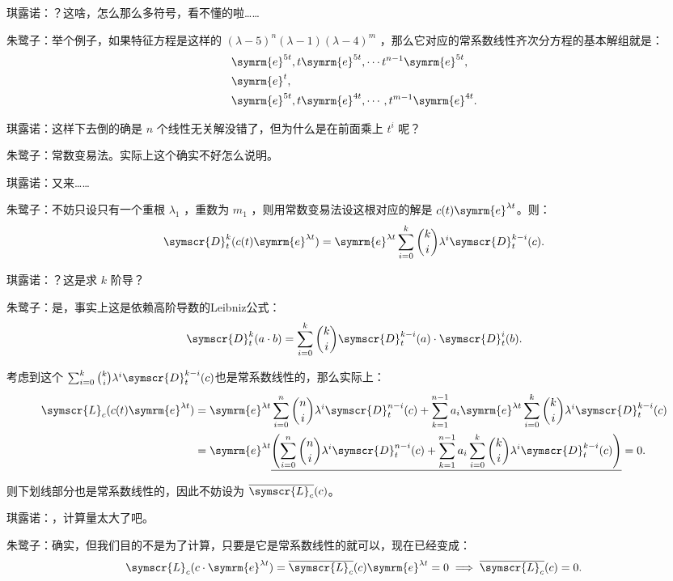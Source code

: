 琪露诺：？这啥，怎么那么多符号，看不懂的啦……

朱鹭子：举个例子，如果特征方程是这样的 \((\lambda -5)^n(\lambda -1)(\lambda -4)^m\) ，那么它对应的常系数线性齐次分方程的基本解组就是：
\[
	\begin{aligned}
		 & \symrm{e} ^{5t},t\symrm{e} ^{5t},\cdots t^{n-1}\symrm{e} ^{5t},  \\
		 & \symrm{e} ^{t},                                                  \\
		 & \symrm{e} ^{5t},t\symrm{e} ^{4t},\cdots ,t^{m-1}\symrm{e} ^{4t}.
	\end{aligned}
\]

琪露诺：这样下去倒的确是 \(n\) 个线性无关解没错了，但为什么是在前面乘上 \(t^i\)  呢？

朱鹭子：常数变易法。实际上这个确实不好怎么说明。

琪露诺：又来……

朱鹭子：不妨只设只有一个重根 \(\lambda_1 \) ，重数为 \(m_1\) ，则用常数变易法设这根对应的解是 \( c(t)\symrm{e} ^{\lambda t}\)。则：
\[
	\symscr{D} _t^k (c(t)\symrm{e} ^{\lambda t})=\symrm{e} ^{\lambda t}\sum_{i=0}^{k} \binom{k}{i}\lambda ^i\symscr{D} ^{k-i}_t(c)
	.\]

琪露诺：？这是求 \(k\) 阶导？

朱鹭子：是，事实上这是依赖高阶导数的Leibniz公式：
\[
	\symscr{D} _t^k(a\cdot b)= \sum_{i=0}^{k} \binom{k}{i}\symscr{D} ^{k-i}_t(a)\cdot \symscr{D} ^{i}_t(b)
	.\]

考虑到这个 \(\sum_{i=0}^{k} \binom{k}{i}\lambda ^i\symscr{D} ^{k-i}_t(c)\)也是常系数线性的，那么实际上：
\[
	\begin{aligned}
		\symscr{L} _c(c(t)\symrm{e} ^{\lambda t}) & = \symrm{e} ^{\lambda t}\sum_{i=0}^{n} \binom{n}{i}\lambda ^i\symscr{D} ^{n-i}_t(c)+\sum_{k=1}^{n-1} a_i\symrm{e} ^{\lambda t}\sum_{i=0}^{k} \binom{k}{i}\lambda ^i\symscr{D} ^{k-i}_t(c)         \\
		                                          & =\symrm{e} ^{\lambda t}\underline{\left( \sum_{i=0}^{n} \binom{n}{i}\lambda ^i\symscr{D} ^{n-i}_t(c)+ \sum_{k=1}^{n-1} a_i\sum_{i=0}^{k} \binom{k}{i}\lambda ^i\symscr{D} ^{k-i}_t(c)\right) }=0.
	\end{aligned}
\]

则下划线部分也是常系数线性的，因此不妨设为 \(\overline{\symscr{L} _c}(c)\)。

琪露诺：，计算量太大了吧。

朱鹭子：确实，但我们目的不是为了计算，只要是它是常系数线性的就可以，现在已经变成：
\[
	\symscr{L} _c(c\cdot\symrm{e} ^{\lambda t}) = \overline{\symscr{L} _c}(c)\symrm{e} ^{\lambda t}=0\implies\overline{\symscr{L} _c}(c)=0
	.\]

